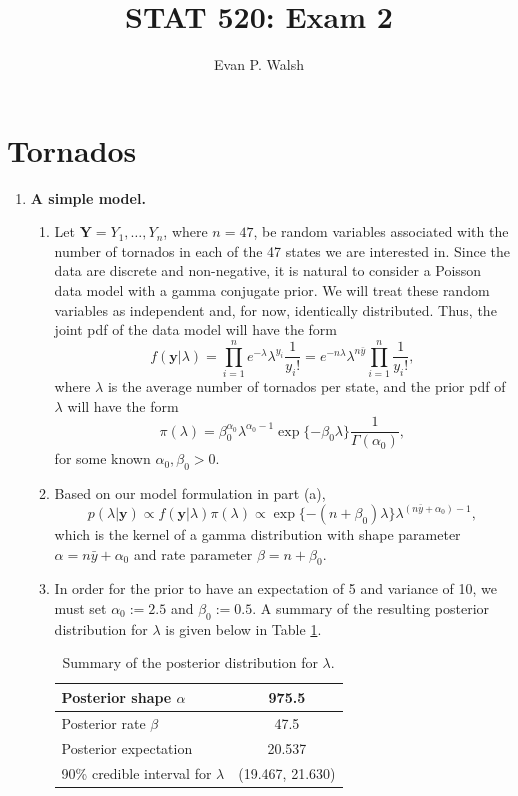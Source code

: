 \documentclass[12pt]{article}
\title{STAT 520: Exam 2}
\author{Evan P. Walsh}
\begin{document}

\section*{Tornados}

\begin{enumerate}[leftmargin=*]
  \item \textbf{A simple model.}
    \begin{enumerate}[leftmargin=1mm]
      \item Let $\bm{Y} = Y_1, \dots, Y_n$, where $n = 47$, be random variables associated with the number of tornados in each of the 47 states we are
        interested in. Since the data are discrete and non-negative, it is natural to consider a Poisson data model with a gamma conjugate prior.
        We will treat these random variables as independent and, for now, identically distributed. Thus,
        the joint pdf of the data model will have the form
        \[
          f(\bm{y}|\lambda) = \prod_{i=1}^{n} e^{-\lambda}\lambda^{y_i} \frac{1}{y_i!} = e^{-n\lambda}\lambda^{n\bar{y}}
          \prod_{i=1}^{n}\frac{1}{y_i!},
        \]
        where $\lambda$ is the average number of tornados per state, and the prior pdf of $\lambda$ will have the form
        \[
          \pi(\lambda) = \beta_0^{\alpha_0} \lambda^{\alpha_0 - 1}\exp\{-\beta_0\lambda\} \frac{1}{\Gamma(\alpha_0)},
        \]
        for some known $\alpha_0, \beta_0 > 0$.

      \item Based on our model formulation in part (a),
        \[
          p(\lambda|\bm{y}) \propto f(\bm{y}|\lambda) \pi(\lambda) \propto \exp\{-(n + \beta_0)\lambda\} \lambda^{(n\bar{y} + \alpha_0) - 1},
        \]
        which is the kernel of a gamma distribution with shape parameter $\alpha = n\bar{y} + \alpha_0$ and rate parameter $\beta = n + \beta_0$.

      \item In order for the prior to have an expectation of 5 and variance of 10, we must set $\alpha_0 := 2.5$ and $\beta_0 := 0.5$. A summary of
        the resulting posterior distribution for $\lambda$ is given below in Table \ref{tab:1}.

        \begin{table}[h!]
          \centering
          \begin{tabular}{lc}
            \hline
            Posterior shape $\alpha$ & 975.5 \\
            \hline
            Posterior rate $\beta$ & 47.5  \\
            \hline
            Posterior expectation & 20.537 \\
            \hline
            90\% credible interval for $\lambda$ & (19.467, 21.630) \\
            \hline
          \end{tabular}
          \caption{Summary of the posterior distribution for $\lambda$.}
          \label{tab:1}
        \end{table}


\end{enumerate}
\end{enumerate}
\end{document}
